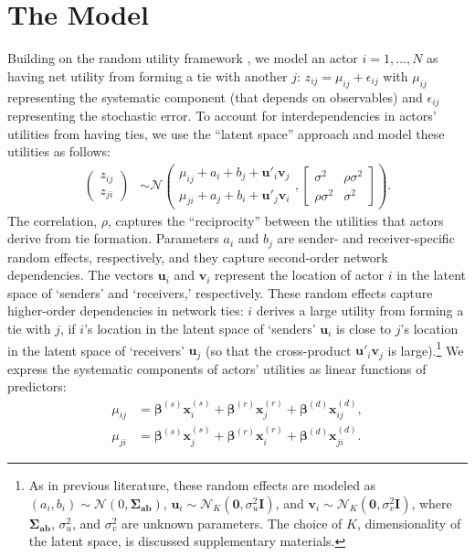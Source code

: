 \section{The Model}

Building on the random utility framework \citep{mcfadden:1980}, we model an actor $i = 1, \ldots,  N$ as having net utility from forming a tie with another $j$: $z_{ij} = \mu_{ij} + \epsilon_{ij}$ with $\mu_{ij}$ representing the systematic component (that depends on observables) and $\epsilon_{ij}$ representing the stochastic error. To account for interdependencies in actors' utilities from having ties, we use the ``latent space'' approach \citep{hoff:2005} and model these utilities as follows:
\begin{align}    
\left ( \begin{array}{c}
         z_{ij} \\
         z_{ji} \end{array} \right ) 
         & \sim \mathcal{N}
        \left ( \begin{array}{c}
         \mu_{ij} + a_i + b_j +    \bm{u}'_i\bm{v}_j  \\
         \mu_{ji} + a_j + b_i +  \bm{u}'_j\bm{v}_i \end{array}, \left [ \begin{array}{cc}
        \sigma^2 & \rho \sigma^2 \\
         \rho \sigma^2 & \sigma^2 \end{array} \right] \right ). \label{eq:modz}
\end{align}
The correlation, $\rho$, captures the ``reciprocity'' between the utilities that actors derive from tie formation. Parameters $a_i$ and $b_j$ are sender- and receiver-specific random effects, respectively, and they capture second-order network dependencies. The vectors $\bm{u}_i$ and $\bm{v}_i$ represent the location of actor $i$ in the latent space of `senders' and `receivers,' respectively. These random effects capture higher-order dependencies in network ties: $i$ derives a large utility from forming a tie with $j$, if $i$'s location in the latent space of `senders' $\bm{u}_i$ is close to $j$'s location in the latent space of `receivers' $\bm{u}_j$ (so that the cross-product $\bm{u}'_i\bm{v}_j$ is large).\footnote{As in previous literature, these random effects are modeled as $(a_i, b_i) \sim \mathcal{N}(0, \bm{\Sigma_{ab}})$, $\bm{u}_i \sim \mathcal{N}_K(\bm{0}, \sigma_u^2\bm{I})$, and $\bm{v}_i \sim \mathcal{N}_K(\bm{0}, \sigma_v^2\bm{I})$, where $\bm{\Sigma_{ab}}$, $\sigma_u^2$, and $\sigma_v^2$ are unknown parameters. The choice of $K$, dimensionality of the latent space, is discussed supplementary materials.} We express the systematic components of actors' utilities as linear functions of predictors:
\begin{align}
    \mu_{ij} & = \bm{\beta}^{(s)}\bm{x}_i^{(s)} + \bm{\beta}^{(r)}\bm{x}_j^{(r)} + \bm{\beta}^{(d)}\bm{x}_{ij}^{(d)}, \label{eq:itoj}\\
    \mu_{ji} & = \bm{\beta}^{(s)}\bm{x}_j^{(s)} + \bm{\beta}^{(r)}\bm{x}_i^{(r)} + \bm{\beta}^{(d)}\bm{x}_{ji}^{(d)} \label{eq:jtoi}.
\end{align}

